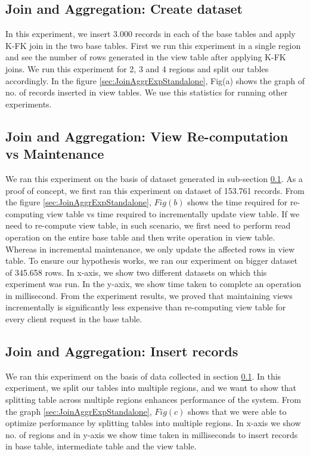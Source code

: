 \documentclass[11pt,a4paper,bibtotoc,idxtotoc,headsepline,footsepline,footexclude,BCOR12mm,DIV13]{scrbook}
\begin{document}
\subsection{Join and Aggregation: Create dataset}
\label{Join and Aggregation: Insert records Standalone}

In this experiment, we insert 3.000 records in each of the base tables and apply K-FK join in the two base tables. First we run this experiment in a single region and see the number of rows generated in the view table after applying K-FK joins. We run this experiment for 2, 3 and 4 regions and split our tables accordingly. In the figure \ref{sec:JoinAggrExpStandalone}, Fig(a) shows the graph of no. of records inserted in view tables. We use this statistics for running other experiments.

\subsection{Join and Aggregation: View Re-computation vs Maintenance}
\label{Join and Aggregation: View Re-computation vs Maintenance Standalone}

We ran this experiment on the basis of dataset generated in sub-section \ref{Join and Aggregation: Insert records Standalone}. As a proof of concept, we first ran this experiment on dataset of 153.761 records. From the figure \ref{sec:JoinAggrExpStandalone}, $Fig(b)$ shows the time required for re-computing view table vs time required to incrementally update view table. If we need to re-compute view table, in such scenario, we first need to perform read operation on the entire base table and then write operation in view table. Whereas in incremental maintenance, we only update the affected rows in view table. To ensure our hypothesis works, we ran our experiment on bigger dataset of 345.658 rows. In x-axis, we show two different datasets on which this experiment was run. In the y-axix, we show time taken to complete an operation in millisecond. From the experiment results, we proved that maintaining views incrementally is significantly less expensive than re-computing view table for every client request in the base table.

\subsection{Join and Aggregation: Insert records}
\label{Join and Aggregation: Insert Records Standalone}

We ran this experiment on the basis of data collected in section \ref{Join and Aggregation: Insert records Standalone}. In this experiment, we split our tables into multiple regions, and we want to show that splitting table across multiple regions enhances performance of the system. From the graph \ref{sec:JoinAggrExpStandalone}, $Fig(c)$ shows that we were able to optimize performance by splitting tables into multiple regions. In x-axis we show no. of regions and in y-axis we show time taken in milliseconds to insert records in base table, intermediate table and the view table. 
\end{document}
